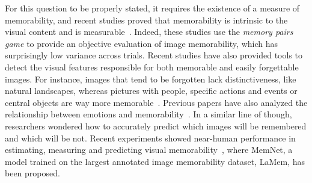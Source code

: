 \documentclass{sig-alternate-05-2015}
\begin{document}
For this question to be properly stated, it requires the existence of a measure of memorability, and recent studies proved that memorability is intrinsic to the visual content and is measurable~\cite{isola2011what,isola2014what}. Indeed, these studies use the \textit{memory pairs game} to provide an objective evaluation of image memorability, which has surprisingly low variance across trials.
Recent studies have also provided tools to detect the visual features responsible for both memorable and easily forgettable images. For instance, images that tend to be forgotten lack distinctiveness, like natural landscapes, whereas pictures with people, specific actions and events or central objects are way more memorable~\cite{brady2008visual}. 
Previous papers have also analyzed the relationship between emotions and memorability~\cite{cahill1995novel}. 
In a similar line of though, researchers wondered how to accurately predict which images will be remembered and which will be not. Recent experiments showed near-human performance in estimating, measuring and predicting visual memorability~\cite{khosla2015understanding}, where MemNet, a model trained on the largest annotated image memorability dataset, LaMem, has been proposed.
\end{document}
